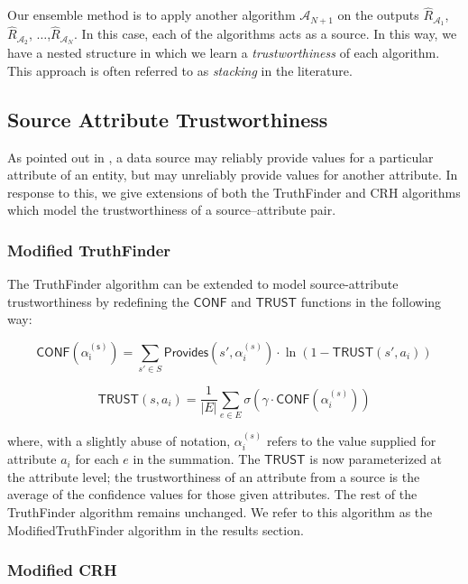\documentclass{acm_proc_article-sp}
\begin{document}
Our ensemble method is to apply another algorithm $\mathcal{A}_{N+1}$ on the outputs $\hat{R}_{\mathcal{A}_1}$, $\hat{R}_{\mathcal{A}_2}$, $\dots$,$\hat{R}_{\mathcal{A}_N}$. In this case, each of the algorithms acts as a source. In this way, we have a nested structure in which we learn a \emph{trustworthiness} of each algorithm. This approach is often referred to as \emph{stacking} in the literature. 

\subsection{Source Attribute Trustworthiness}

As pointed out in \cite{li:truth}, a data source may reliably provide values for a particular attribute of an entity, but may unreliably provide values for another attribute. In response to this, we give extensions of both the {\sc TruthFinder} and {\sc CRH} algorithms which model the trustworthiness of a source--attribute pair. 

\subsubsection{Modified TruthFinder}

 The {\sc TruthFinder} algorithm can be extended to model source-attribute trustworthiness by  redefining the $\mathsf{CONF}$ and $\mathsf{TRUST}$ functions in the following way: 

\begin{equation}
\mathsf{CONF(\alpha_i^{(s)})} = \sum_{s' \in S} \mathsf{Provides}(s',\alpha_i^{(s)}) \cdot \ln(1-\mathsf{TRUST}(s',a_i))
\end{equation}


\begin{equation}
\mathsf{TRUST}(s,a_i) = \frac{1}{|E|} \sum_{e \in E} \sigma(\gamma \cdot \mathsf{CONF}(\alpha_i^{(s)}))
\end{equation}

where, with a slightly abuse of notation, $\alpha_i^{(s)}$ refers to the value supplied for attribute $a_i$ for each $e$ in the summation. The  $\mathsf{TRUST}$ is now parameterized at the attribute level; the trustworthiness of an attribute from a source is the average of the confidence values for those given attributes. The rest of the {\sc TruthFinder} algorithm remains unchanged. We refer to this algorithm as the {\sc ModifiedTruthFinder} algorithm in the results section. 

\subsubsection{Modified CRH}
\end{document}
